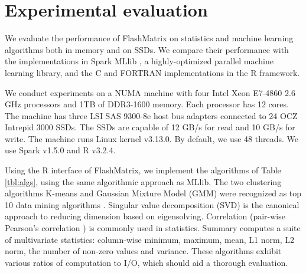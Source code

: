 \section{Experimental evaluation}
We evaluate the performance of FlashMatrix on statistics and machine learning
algorithms both in memory and on SSDs. We compare their performance with
the implementations in Spark MLlib \cite{mllib}, a highly-optimized parallel
machine learning library, and the C and FORTRAN implementations in the R framework.


We conduct experiments on a NUMA machine with
four Intel Xeon E7-4860 2.6 GHz processors and 1TB of 
DDR3-1600 memory. Each processor has 12 cores. The machine has three LSI SAS 9300-8e
host bus adapters connected to
24 OCZ Intrepid 3000 SSDs. The SSDs are capable of
12 GB/s for read and 10 GB/s for write. The machine runs
Linux kernel v3.13.0. By default, we use 48 threads. 
We use Spark v1.5.0 and R v3.2.4.


Using the R interface of FlashMatrix, we implement the algorithms of 
Table \ref{tbl:algs}, using the same algorithmic approach as MLlib.
The two clustering algorithms 
K-means \cite{kmeans} and Gaussian Mixture Model (GMM) \cite{gmm} 
were recognized as top 10 data mining algorithms \cite{top10}. 
Singular value decomposition (SVD) is the canonical approach to 
reducing dimension based on eigensolving.  Correlation 
(pair-wise Pearson's correlation \cite{cor}) is commonly used in statistics.
Summary computes a suite of multivariate statistics:
column-wise minimum, maximum, mean, L1 norm, L2 norm, the number of non-zero values and
		variance.
These algorithms exhibit various ratios of computation to I/O, which should aid
a thorough evaluation.



